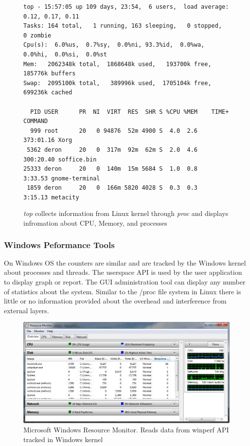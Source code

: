 \begin{figure}[h]
\begin{Verbatim}
top - 15:57:05 up 109 days, 23:54,  6 users,  load average: 0.12, 0.17, 0.11
Tasks: 164 total,   1 running, 163 sleeping,   0 stopped,   0 zombie
Cpu(s):  6.0%us,  0.7%sy,  0.0%ni, 93.3%id,  0.0%wa,  0.0%hi,  0.0%si,  0.0%st
Mem:   2062348k total,  1868648k used,   193700k free,   185776k buffers
Swap:  2095100k total,   389996k used,  1705104k free,   699236k cached

  PID USER      PR  NI  VIRT  RES  SHR S %CPU %MEM    TIME+  COMMAND            
  999 root      20   0 94876  52m 4900 S  4.0  2.6 373:01.16 Xorg               
 5362 deron     20   0  317m  92m  62m S  2.0  4.6 300:20.40 soffice.bin        
25333 deron     20   0  140m  15m 5684 S  1.0  0.8   3:33.53 gnome-terminal     
 1859 deron     20   0  166m 5820 4028 S  0.3  0.3   3:15.13 metacity           
\end{Verbatim}
\caption{\emph{top} collects information from Linux kernel through \emph{proc} and displays infromation about CPU, Memory, and processes}
\label{fig:top}
\end{figure}

\subsubsection{Windows Peformance Tools}
On Windows OS the counters are similar and are tracked by the Windows kernel about processes and threads.  The userspace API \cite{winperf} is used by the user application to display graph or report. The GUI administration tool can display any number of statistics about the system.  Similar to the /proc file system in Linux there is little or no information provided about the overhead and interference from external layers.

\begin{figure}[!h]
  \begin{center}
  \includegraphics[width=6in]{images/ResourceMonitor.jpg}
  \caption{Microsoft Windows Resource Monitor.  Reads data from winperf API tracked in Windows kernel}
  \label{resourceMonitor}
  \end{center}
\end{figure}

